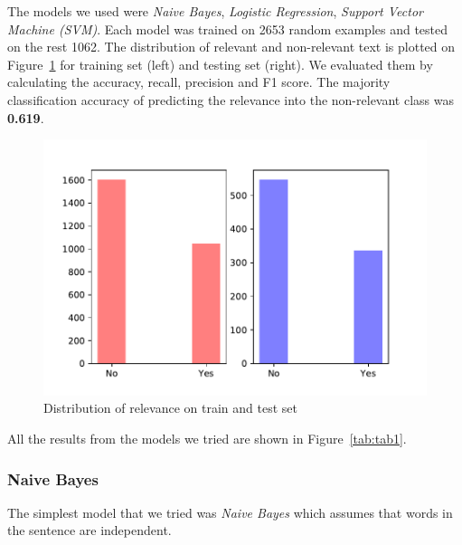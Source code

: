 \documentclass[11pt,a4paper]{article}
\begin{document}
The models we used were \textit{Naive Bayes}, \textit{Logistic Regression}, \textit{Support Vector Machine (SVM)}.
Each model was trained on 2653 random examples and tested on the rest 1062.
The distribution of relevant and non-relevant text is plotted on Figure~\ref{fig:fig1} for training set (left) and testing set (right).
We evaluated them by calculating the accuracy, recall, precision and F1 score.
The majority classification accuracy of predicting the relevance into the non-relevant class was \textbf{0.619}.

\begin{figure}[h]
    \centering
    \includegraphics[width=1.1\columnwidth]{Figures/distribution.pdf}
    \caption{Distribution of relevance on train and test set}
    \label{fig:fig1}
\end{figure}

All the results from the models we tried are shown in Figure~\ref{tab:tab1}.

\subsubsection{Naive Bayes}
The simplest model that we tried was \textit{Naive Bayes} which assumes that words in the sentence are independent.

\end{document}
